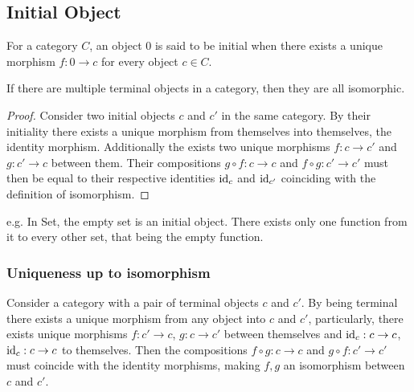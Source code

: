\subsection{Initial Object}

\begin{definition}
  For a category $C$, an object $0$ is said to be initial when there exists a
  unique morphism $f: 0\to c$ for every object $c\in C$.
  \parencite{awodey:category_theory}
\end{definition}

\begin{theorem}\label{thm:init_obj_iso} If
  there are multiple terminal objects in a category, then they are all
  isomorphic.

  \begin{proof}
    Consider two initial objects $c$ and $c'$ in the same category. By their
    initiality there exists a unique morphism from themselves into themselves,
    the identity morphism. Additionally the exists two unique morphisms $f:c\to
    c'$ and $g:c' \to c$ between them. Their compositions $g\circ f:c\to c$ and
    $f\circ g:c'\to c'$ must then be equal to their respective identities
    $\mathrm{id}_c$ and $\mathrm{id}_{c'}$ coinciding with the definition of isomorphism.
  \end{proof}
\end{theorem}
e.g. In Set, the empty set is an initial object. There exists only one function
from it to every other set, that being the empty function.

\subsubsection*{Uniqueness up to isomorphism}

Consider a category with a pair of terminal objects $c$ and $c'$. By being
terminal there exists a unique morphism from any object into $c$ and $c'$,
particularly, there exists unique morphisms $f: c' \to c$, $g: c \to c'$ between
themselves and $\mathrm{id}_c: c\to c$, $\mathrm{id}_c: c\to c$ to themselves.
Then the compositions $f\circ g:c\to c$ and $g\circ f:c' \to c'$ must coincide
with the identity morphisms, making $f,g$ an isomorphism between $c$ and $c'$.